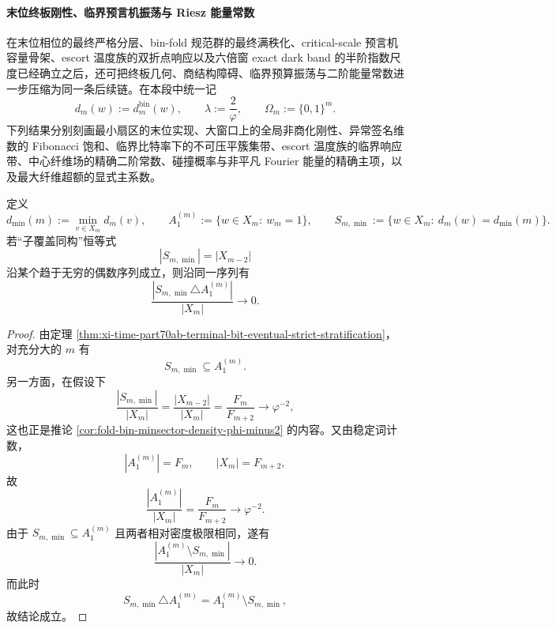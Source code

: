 \paragraph{末位终板刚性、临界预言机振荡与 Riesz 能量常数}
在末位相位的最终严格分层、bin-fold 规范群的最终满秩化、critical-scale 预言机容量骨架、escort 温度族的双折点响应以及六倍窗 exact dark band 的半阶指数尺度已经确立之后，还可把终板几何、商结构障碍、临界预算振荡与二阶能量常数进一步压缩为同一条后续链。在本段中统一记
\[
d_m(w):=d_m^{\mathrm{bin}}(w),
\qquad
\lambda:=\frac{2}{\varphi},
\qquad
\Omega_m:=\{0,1\}^m.
\]
下列结果分别刻画最小扇区的末位实现、大窗口上的全局非商化刚性、异常签名维数的 Fibonacci 饱和、临界比特率下的不可压平簇集带、escort 温度族的临界响应带、中心纤维场的精确二阶常数、碰撞概率与非平凡 Fourier 能量的精确主项，以及最大纤维超额的显式主系数。

\begin{theorem}[最小扇区的末位实现与终板逼近]\label{thm:xi-time-part70d-minsector-terminal-sheet-realization}
定义
\[
d_{\min}(m):=\min_{v\in X_m}d_m(v),
\qquad
A_1^{(m)}:=\{w\in X_m:\ w_m=1\},
\qquad
S_{m,\min}:=\{w\in X_m:\ d_m(w)=d_{\min}(m)\}.
\]
若“子覆盖同构”恒等式
\[
|S_{m,\min}|=|X_{m-2}|
\]
沿某个趋于无穷的偶数序列成立，则沿同一序列有
\[
\frac{|S_{m,\min}\triangle A_1^{(m)}|}{|X_m|}\longrightarrow 0.
\]
\end{theorem}
\begin{proof}
由定理 \ref{thm:xi-time-part70ab-terminal-bit-eventual-strict-stratification}，对充分大的 \(m\) 有
\[
S_{m,\min}\subseteq A_1^{(m)}.
\]
另一方面，在假设下
\[
\frac{|S_{m,\min}|}{|X_m|}
=
\frac{|X_{m-2}|}{|X_m|}
=
\frac{F_m}{F_{m+2}}
\longrightarrow
\varphi^{-2},
\]
这也正是推论 \ref{cor:fold-bin-minsector-density-phi-minus2} 的内容。又由稳定词计数，
\[
|A_1^{(m)}|=F_m,
\qquad
|X_m|=F_{m+2},
\]
故
\[
\frac{|A_1^{(m)}|}{|X_m|}=\frac{F_m}{F_{m+2}}\longrightarrow \varphi^{-2}.
\]
由于 \(S_{m,\min}\subseteq A_1^{(m)}\) 且两者相对密度极限相同，遂有
\[
\frac{|A_1^{(m)}\setminus S_{m,\min}|}{|X_m|}\longrightarrow 0.
\]
而此时
\[
S_{m,\min}\triangle A_1^{(m)}=A_1^{(m)}\setminus S_{m,\min},
\]
故结论成立。
\end{proof}

